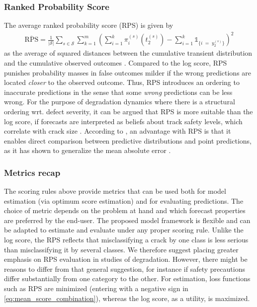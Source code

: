 \subsubsection{Ranked Probability Score}
The average ranked probability score (RPS) is given by
\begin{align}
    \overline{\text{RPS}} =\frac{1}{\vert \mathcal{S} \vert} \sum_{s \in \mathcal{S}} \sum_{k = 1}^m\left( \sum_{i = 1}^k \pi^{(s)}_i\left( t_2^{(s)} \right)  - \sum_{i = 1}^k\mathds{1}_{ \{ i \; = \; y_2^{(s)} \} } \right)^2 \label{eq:RPS}
\end{align}
as the average of squared distances between the cumulative transient distribution and the cumulative observed outcomes \citep{Epstein1969}.
Compared to the log score, RPS punishes probability masses in false outcomes milder if the wrong predictions are located \textit{closer} to the observed outcome. Thus, RPS introduces an ordering to inaccurate predictions in the sense that some \textit{wrong} predictions can be less wrong.
For the purpose of degradation dynamics where there is a structural ordering wrt. defect severity, it can be argued that RPS is more suitable than the log score, if forecasts are interpreted as beliefs about track 
safety levels, which correlate with crack size \citep{UIC_2002_defecthandbook}. 
According to \citet{Czado2009}, an advantage with RPS is that it enables direct comparison between predictive distributions and point predictions, as it has shown to generalize the mean absolute error \citep{Hersbach2000}.



\subsubsection{Metrics recap} \label{sec:metrics_recap}
The scoring rules above provide metrics that can be used both for model estimation (via optimum score estimation) and for evaluating predictions. The choice of metric depends on the problem at hand and which forecast properties are preferred by the end-user. 
The proposed model framework is flexible and can be adapted to estimate and evaluate under any proper scoring rule.
Unlike the log score, the RPS reflects that misclassifying a crack by one class is less serious than misclassifying it by several classes. We therefore suggest placing greater emphasis on RPS evaluation in studies of degradation. 
However, there might be reasons to differ from that general suggestion, for instance if safety precautions differ substantially from one category to the other.
For estimation, loss functions such as RPS are minimized (entering with a negative sign in \cref{eq:mean_score_combination}), whereas the log score, as a utility, is maximized.


